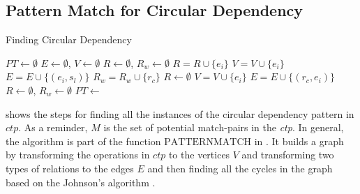 \subsection{Pattern Match for Circular Dependency}

\begin{algorithm}
\caption{Finding Circular Dependency}\label{algo:circular}
\begin{algorithmic}[1]
\State $\mathit{PT} \gets \emptyset$
\State $\mathit{E} \gets \emptyset$, $\mathit{V} \gets \emptyset$
\State $\mathit{R} \gets \emptyset$, $\mathit{R_w} \gets \emptyset$
\State $\mathit{R} = \mathit{R} \cup \{\mathit{e_i}\}$
\State $\mathit{V} = \mathit{V} \cup \{\mathit{e_i}\}$
 
\State $\mathit{E} = \mathit{E} \cup \{(\mathit{e_i},\mathit{s_l})\}$  
\EndFor
\EndIf
{}
\State $\mathit{R_w} = \mathit{R_w} \cup \{\mathit{r_c}\}$
\EndFor
\State $\mathit{R} \gets \emptyset$ 
\EndIf
{}
\State $\mathit{V} = \mathit{V} \cup \{\mathit{e_i}\}$
  
\State $\mathit{E} = \mathit{E} \cup \{(\mathit{r_c},\mathit{e_i})\}$
\EndFor
\EndIf
\EndFor
\State $\mathit{R} \gets \emptyset$, $\mathit{R_w} \gets \emptyset$
\EndFor
\State $\mathit{PT} \gets$ 
\end{algorithmic}
\end{algorithm}

 shows the steps for finding all the instances of the circular dependency pattern in $\mathit{ctp}$. As a reminder, $M$ is the set of potential match-pairs in the \emph{ctp}.  In general, the algorithm is part of the function $\mathrm{PATTERNMATCH}$ in . It builds a graph by transforming the operations in $\mathit{ctp}$ to the vertices $\mathit{V}$ and transforming two types of relations to the edges $\mathit{E}$ and then finding all the cycles in the graph based on the Johnson's algorithm \cite{DBLP:journals/siamcomp/Johnson75}.
 
